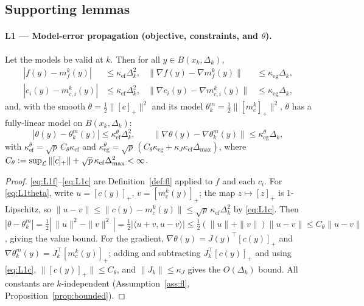 \subsection{Supporting lemmas}
\label{sec:lemmas}

\paragraph{L1 --- Model-error propagation (objective, constraints, and $\theta$).}

\begin{lemma}[L1]
  \label{lem:L1}
  Let the models be valid at $k$. Then for all $y\in B(x_k,\Delta_k)$,
  \begin{align}
    |f(y)-m_f^k(y)|            &\le \kappa_{\mathrm{ef}}\Delta_k^2, &
    \|\nabla f(y)-\nabla m_f^k(y)\| &\le \kappa_{\mathrm{eg}}\Delta_k, \label{eq:L1f}\\
    |c_i(y)-m_{c,i}^k(y)|      &\le \kappa_{\mathrm{ef}}\Delta_k^2, &
    \|\nabla c_i(y)-\nabla m_{c,i}^k(y)\| &\le \kappa_{\mathrm{eg}}\Delta_k, \label{eq:L1c}
  \end{align}
  and, with the smooth $\theta=\tfrac12\|[c]_+\|^2$ and its model
  $\theta_k^m=\tfrac12\|[m_c^k]_+\|^2$, $\theta$ has a fully-linear model on
  $B(x_k,\Delta_k)$:
  \begin{equation}
    \label{eq:L1theta}
    |\theta(y)-\theta_k^m(y)| \le \kappa_{\mathrm{ef}}^{\theta}\Delta_k^2,
    \qquad
    \|\nabla\theta(y)-\nabla\theta_k^m(y)\| \le \kappa_{\mathrm{eg}}^{\theta}\Delta_k,
  \end{equation}
  with $\kappa_{\mathrm{ef}}^{\theta}=\sqrt p\,C_\theta\kappa_{\mathrm{ef}}$ and
  $\kappa_{\mathrm{eg}}^{\theta}=\sqrt p\,(C_\theta\kappa_{\mathrm{eg}}+\kappa_J\kappa_{\mathrm{ef}}\Delta_{\max})$,
  where $C_\theta:=\sup_{\mathcal{L}}\|[c]_+\|+\sqrt p\,\kappa_{\mathrm{ef}}\Delta_{\max}^2<\infty$.
\end{lemma}
\begin{proof}
  \eqref{eq:L1f}--\eqref{eq:L1c} are Definition~\ref{def:fl} applied to $f$ and each
  $c_i$. For \eqref{eq:L1theta}, write $u=[c(y)]_+$, $v=[m_c^k(y)]_+$; the map
  $z\mapsto[z]_+$ is $1$-Lipschitz, so $\|u-v\|\le\|c(y)-m_c^k(y)\|\le\sqrt p\,\kappa_{\mathrm{ef}}\Delta_k^2$
  by \eqref{eq:L1c}. Then
  $|\theta-\theta_k^m|=\tfrac12|\,\|u\|^2-\|v\|^2\,|=\tfrac12|\langle u+v,u-v\rangle|\le\tfrac12(\|u\|+\|v\|)\|u-v\|\le C_\theta\|u-v\|$,
  giving the value bound. For the gradient, $\nabla\theta(y)=J(y)^\top[c(y)]_+$ and
  $\nabla\theta_k^m(y)=J_k^\top[m_c^k(y)]_+$; adding and subtracting $J_k^\top[c(y)]_+$
  and using \eqref{eq:L1c}, $\|[c(y)]_+\|\le C_\theta$, and $\|J_k\|\le\kappa_J$ gives
  the $O(\Delta_k)$ bound. All constants are $k$-independent (Assumption~\ref{ass:fl},
  Proposition~\ref{prop:bounded}).
\end{proof}

